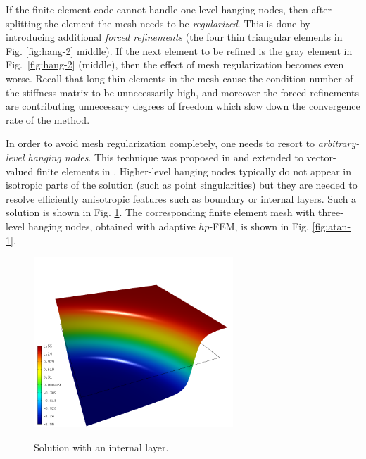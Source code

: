 \documentclass[final,3p,times,twocolumn]{elsarticle}
\begin{document}
If the finite element code cannot handle one-level hanging nodes,
then after splitting the element the mesh needs to be
{\em regularized}. This is done by introducing 
additional {\em forced refinements} (the four thin triangular
elements in Fig. \ref{fig:hang-2} middle). If the next 
element to be refined is the gray element in Fig.~\ref{fig:hang-2}
(middle), then the effect of mesh regularization becomes even 
worse. Recall that long thin elements in the mesh cause 
the condition number of the stiffness matrix to be unnecessarily 
high, and moreover the forced refinements are contributing unnecessary 
degrees of freedom which slow down the convergence rate of the method.


In order to avoid mesh regularization completely, one needs to resort to 
{\em arbitrary-level hanging nodes}. This technique was proposed in 
\cite{hangno-1} and extended to vector-valued finite elements in \cite{hangno-2}.
Higher-level hanging nodes typically do not appear in isotropic parts 
of the solution (such as point singularities) but they are needed to
resolve efficiently anisotropic features such as boundary or internal
layers. Such a solution
is shown in Fig. \ref{fig:atan-2}. The corresponding finite element mesh with 
three-level hanging nodes, obtained with adaptive $hp$-FEM, is shown in 
Fig. \ref{fig:atan-1}.

\begin{figure}[!htb]
\begin{center}
 {
\includegraphics[width=7.5cm]{atan-2.png}
}
\end{center}
\vspace{-5mm}
\caption{Solution with an internal layer.}
\label{fig:atan-2}
\end{figure}
\end{document}
